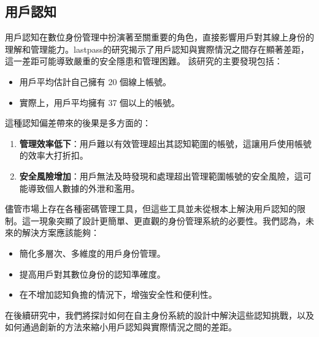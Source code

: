 \subsection{用戶認知}
用戶認知在數位身份管理中扮演著至關重要的角色，直接影響用戶對其線上身份的理解和管理能力。lastpass\cite{lastpass2020psychology}的研究揭示了用戶認知與實際情況之間存在顯著差距，這一差距可能導致嚴重的安全隱患和管理困難。
該研究的主要發現包括：
\begin{itemize}
  \item 用戶平均估計自己擁有 20 個線上帳號。
  \item 實際上，用戶平均擁有 37 個以上的帳號。
\end{itemize}
這種認知偏差帶來的後果是多方面的：
\begin{enumerate}
  \item \textbf{管理效率低下}：用戶難以有效管理超出其認知範圍的帳號，這讓用戶使用帳號的效率大打折扣。
  \item \textbf{安全風險增加}：用戶無法及時發現和處理超出管理範圍帳號的安全風險，這可能導致個人數據的外泄和濫用。
\end{enumerate}
儘管市場上存在各種密碼管理工具，但這些工具並未從根本上解決用戶認知的限制。這一現象突顯了設計更簡單、更直觀的身份管理系統的必要性。我們認為，未來的解決方案應該能夠：
\begin{itemize}
  \item 簡化多層次、多維度的用戶身份管理。
  \item 提高用戶對其數位身份的認知準確度。
  \item 在不增加認知負擔的情況下，增強安全性和便利性。
\end{itemize}
在後續研究中，我們將探討如何在自主身份系統的設計中解決這些認知挑戰，以及如何通過創新的方法來縮小用戶認知與實際情況之間的差距。
